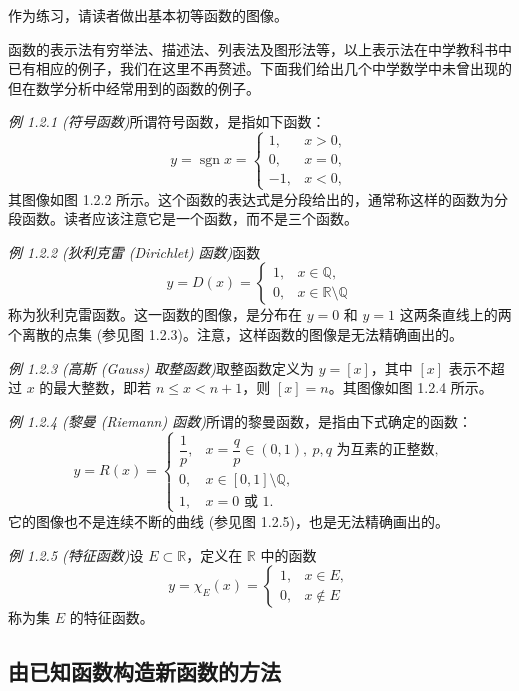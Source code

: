 \documentclass[UTF8,12pt,a4paper,fontset=fandol]{ctexbook}
\begin{document}
作为练习，请读者做出基本初等函数的图像。

函数的表示法有穷举法、描述法、列表法及图形法等，以上表示法在中学教科书中已有相应的例子，我们在这里不再赘述。下面我们给出几个中学数学中未曾出现的但在数学分析中经常用到的函数的例子。

\noindent\emph{例 1.2.1 (符号函数)}\quad 所谓符号函数，是指如下函数：
\[
  y=\operatorname{sgn}x=
  \begin{cases}
    1, & x>0,\\
    0, & x=0,\\
    -1, & x<0,
  \end{cases}
\]
其图像如图 1.2.2 所示。这个函数的表达式是分段给出的，通常称这样的函数为分段函数。读者应该注意它是一个函数，而不是三个函数。

\noindent\emph{例 1.2.2 (狄利克雷 (Dirichlet) 函数)}\quad 函数
\[
  y=D(x)=
  \begin{cases}
    1, & x\in\mathbb{Q},\\
    0, & x\in\mathbb{R}\setminus\mathbb{Q}
  \end{cases}
\]
称为狄利克雷函数。这一函数的图像，是分布在 $y=0$ 和 $y=1$ 这两条直线上的两个离散的点集 (参见图 1.2.3)。注意，这样函数的图像是无法精确画出的。

\noindent\emph{例 1.2.3 (高斯 (Gauss) 取整函数)}\quad 取整函数定义为 $y=[x]$，其中 $[x]$ 表示不超过 $x$ 的最大整数，即若 $n\leqslant x<n+1$，则 $[x]=n$。其图像如图 1.2.4 所示。

\noindent\emph{例 1.2.4 (黎曼 (Riemann) 函数)}\quad 所谓的黎曼函数，是指由下式确定的函数：
\[
  y=R(x)=
  \begin{cases}
    \dfrac1p, & x=\dfrac qp\in(0,1),\ p,q\text{ 为互素的正整数},\\
    0, & x\in[0,1]\setminus\mathbb{Q},\\
    1, & x=0\text{ 或 }1.
  \end{cases}
\]
它的图像也不是连续不断的曲线 (参见图 1.2.5)，也是无法精确画出的。

\noindent\emph{例 1.2.5 (特征函数)}\quad 设 $E\subset\mathbb{R}$，定义在 $\mathbb{R}$ 中的函数
\[
  y=\chi_E(x)=
  \begin{cases}
    1, & x\in E,\\
    0, & x\notin E
  \end{cases}
\]
称为集 $E$ 的特征函数。

\subsection{由已知函数构造新函数的方法}
\end{document}
